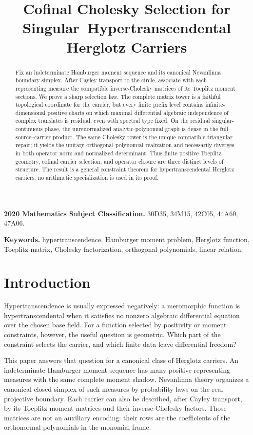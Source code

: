 \documentclass[11pt]{article}
\title{Cofinal Cholesky Selection for Singular\
Hypertranscendental Herglotz Carriers}
\author{}
\date{}
\begin{document}
\maketitle

\begin{abstract}
Fix an indeterminate Hamburger moment sequence and its canonical Nevanlinna boundary simplex.
After Cayley transport to the circle, associate with each representing measure the compatible
inverse-Cholesky matrices of its Toeplitz moment sections.  We prove a sharp selection law.  The
complete matrix tower is a faithful topological coordinate for the carrier, but every finite
prefix level contains infinite-dimensional positive charts on which maximal differential
algebraic independence of complex translates is residual, even with spectral type fixed.  On the
residual singular-continuous phase, the unrenormalized analytic-polynomial graph is dense in the
full source--carrier product.  The same Cholesky tower is the unique compatible triangular repair;
it yields the unitary orthogonal-polynomial realization and necessarily diverges in both operator
norm and normalized determinant.  Thus finite positive Toeplitz geometry, cofinal carrier
selection, and operator closure are three distinct levels of structure.  The result is a general
constraint theorem for hypertranscendental Herglotz carriers; no arithmetic specialization is used
in its proof.
\end{abstract}

\noindent\textbf{2020 Mathematics Subject Classification.}
30D35, 34M15, 42C05, 44A60, 47A06.

\noindent\textbf{Keywords.}
hypertranscendence, Hamburger moment problem, Herglotz function, Toeplitz matrix,
Cholesky factorization, orthogonal polynomials, linear relation.

\section{Introduction}

Hypertranscendence is usually expressed negatively: a meromorphic function is
hypertranscendental when it satisfies no nonzero algebraic differential equation over the chosen
base field.  For a function selected by positivity or moment constraints, however, the useful
question is geometric.  Which part of the constraint selects the carrier, and which finite data
leave differential freedom?

This paper answers that question for a canonical class of Herglotz carriers.  An indeterminate
Hamburger moment sequence has many positive representing measures with the same complete moment
shadow.  Nevanlinna theory organizes a canonical closed simplex of such measures by probability
laws on the real projective boundary.  Each carrier can also be described, after Cayley transport,
by its Toeplitz moment matrices and their inverse-Cholesky factors.  Those matrices are not an
auxiliary encoding: their rows are the coefficients of the orthonormal polynomials in the
monomial frame.
\end{document}
